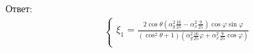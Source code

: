\documentclass[12pt]{article}
\begin{document}
\begin{large}
\par Ответ:
\begin{eqnarray*}
    \begin{cases}
        \xi_1 = \frac{2 \cos \theta \left( \alpha_y^2 \frac{16}{25} - \alpha_x^2 \frac{9}{25} \right) \cos \varphi \sin \varphi}{\left( \cos^2 \theta + 1 \right)\left( \alpha_y^2 \frac{16}{25} \varphi + \alpha_x^2 \frac{9}{25} \cos \varphi \right)} \\

\end{cases}
\end{eqnarray*}
\end{large}
\end{document}
